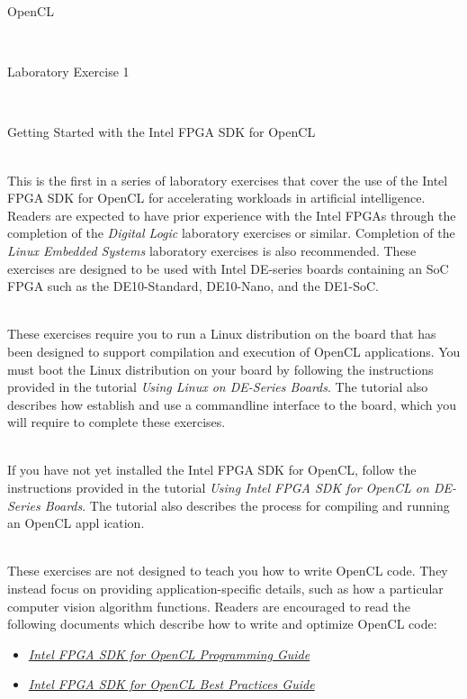 \documentclass[epsfig,10pt,fullpage]{article}
\newcommand{\LabNum}{1}
\begin{document}
\centerline{\huge OpenCL}
~\\
\centerline{\huge Laboratory Exercise \LabNum}
~\\
\centerline{\large Getting Started with the Intel FPGA SDK for OpenCL}
~\\

This is the first in a series of laboratory exercises that cover the use of the Intel FPGA SDK for OpenCL for accelerating workloads
in artificial intelligence. 
Readers are expected to have prior experience with the Intel FPGAs through the completion of the \textit{Digital Logic} laboratory exercises or similar. Completion of the \textit{Linux Embedded Systems} laboratory exercises is also recommended.
These exercises are designed to be used with Intel DE-series boards containing an SoC FPGA such as the DE10-Standard, DE10-Nano, and the DE1-SoC. 

~\\
These exercises require you to run a Linux distribution on the board that has been designed to support compilation and execution of OpenCL applications. 
You must boot the Linux distribution on your board by following the instructions provided in the tutorial \textit{Using Linux on DE-Series Boards}. The tutorial also describes how establish and use a commandline interface to the board, which you will require to complete these exercises.

~\\
If you have not yet installed the Intel FPGA SDK for OpenCL, follow the instructions provided in the  tutorial \textit{Using Intel FPGA SDK for OpenCL on DE-Series Boards}. The tutorial also describes the process for compiling and running an OpenCL appl ication.

~\\
These exercises are not designed to teach you how to write OpenCL code. They instead focus on providing application-specific details, such as how a particular computer vision algorithm functions. Readers are encouraged to read the following documents which describe how to write and optimize OpenCL code:

\begin{itemize}
\item \href{https://www.altera.com/documentation/mwh1391807516407.html}{\textit{Intel FPGA SDK for OpenCL Programming Guide}}
\item \href{https://www.altera.com/documentation/mwh1391807965224.html}{\textit{Intel FPGA SDK for OpenCL Best Practices Guide}}
\end{itemize}
\end{document}
